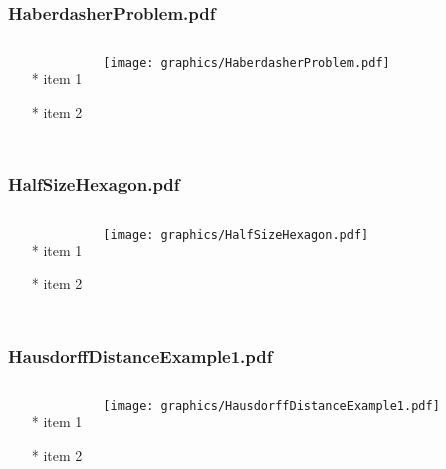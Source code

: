 \documentclass{beamer}
\begin{document}
\begin{frame} \frametitle{HaberdasherProblem.pdf}
    \begin{columns}[c]
        \begin{itemize}
            \item[*] item 1
            \item[*] item 2
        \end{itemize}
        \begin{minipage}{\linewidth}
            \begin{center}
            \texttt{[image: graphics/HaberdasherProblem.pdf]}
            \label{gfx:HaberdasherProblem.pdf}
            \end{center}
        \end{minipage}
    \end{columns}
\end{frame}
\begin{frame} \frametitle{HalfSizeHexagon.pdf}
    \begin{columns}[c]
        \begin{itemize}
            \item[*] item 1
            \item[*] item 2
        \end{itemize}
        \begin{minipage}{\linewidth}
            \begin{center}
            \texttt{[image: graphics/HalfSizeHexagon.pdf]}
            \label{gfx:HalfSizeHexagon.pdf}
            \end{center}
        \end{minipage}
    \end{columns}
\end{frame}
\begin{frame} \frametitle{HausdorffDistanceExample1.pdf}
    \begin{columns}[c]
        \begin{itemize}
            \item[*] item 1
            \item[*] item 2
        \end{itemize}
        \begin{minipage}{\linewidth}
            \begin{center}
            \texttt{[image: graphics/HausdorffDistanceExample1.pdf]}
            \label{gfx:HausdorffDistanceExample1.pdf}
            \end{center}
        \end{minipage}
    \end{columns}
\end{frame}
\end{document}
